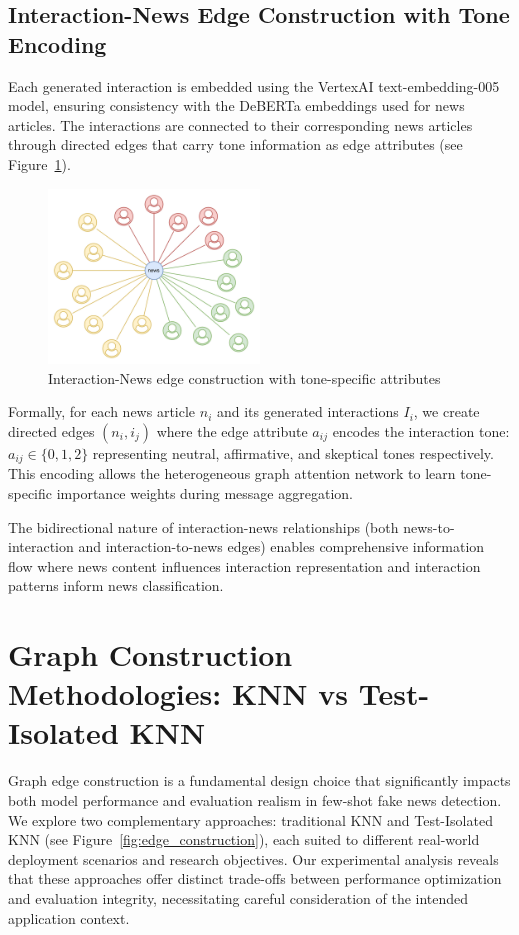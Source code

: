 \subsection{Interaction-News Edge Construction with Tone Encoding}

Each generated interaction is embedded using the VertexAI text-embedding-005 model, ensuring consistency with the DeBERTa embeddings used for news articles. The interactions are connected to their corresponding news articles through directed edges that carry tone information as edge attributes (see Figure~\ref{fig:news_interaction_node}).

\begin{figure}[h]
    \centering
    \includegraphics[width=0.5\textwidth]{context/methodology/fig/news_interaction_node.png}
    \caption{Interaction-News edge construction with tone-specific attributes}
    \label{fig:news_interaction_node}
\end{figure}

Formally, for each news article $n_i$ and its generated interactions $I_i$, we create directed edges $(n_i, i_j)$ where the edge attribute $a_{ij}$ encodes the interaction tone: $a_{ij} \in \{0, 1, 2\}$ representing neutral, affirmative, and skeptical tones respectively. This encoding allows the heterogeneous graph attention network to learn tone-specific importance weights during message aggregation.

The bidirectional nature of interaction-news relationships (both news-to-interaction and interaction-to-news edges) enables comprehensive information flow where news content influences interaction representation and interaction patterns inform news classification.

\section{Graph Construction Methodologies: KNN vs Test-Isolated KNN}

Graph edge construction is a fundamental design choice that significantly impacts both model performance and evaluation realism in few-shot fake news detection. We explore two complementary approaches: traditional KNN and Test-Isolated KNN (see Figure~\ref{fig:edge_construction}), each suited to different real-world deployment scenarios and research objectives. Our experimental analysis reveals that these approaches offer distinct trade-offs between performance optimization and evaluation integrity, necessitating careful consideration of the intended application context.

